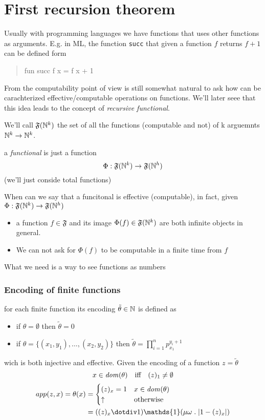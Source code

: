 \chapter{First recursion theorem}

Usually with programming languages we have functions that uses other
functions as arguments.  E.g. in ML, the function \texttt{succ} that
given a function $f$ returns $f+1$ can be defined form
\begin{quote}
    fun succ f x = f x + 1
\end{quote}
From the computability point of view is still somewhat natural to ask
how can be carachterized effective/computable operations on
functions. We'll later seee that this idea leads to the concept of
\emph{recursive functional}.

\begin{definition}
  We'll call $\mathfrak{F}(\mathbb{N}^k)$ the set of all the functions
  (computable and not) of k arguemnts $\mathbb{N}^k \rightarrow \mathbb{N}^k$.
\end{definition}

a \emph{functional} is just a function
\[
  \Phi : \mathfrak{F}(\mathbb{N}^k) \rightarrow \mathfrak{F}(\mathbb{N}^h)
\]
(we'll just conside total functions)

When can we say that a funcitonal is effective (computable), in fact,
given $\Phi : \mathfrak{F}(\mathbb{N}^k) \rightarrow \mathfrak{F}(\mathbb{N}^h)$
\begin{itemize}
\item a function $f \in \mathfrak{F}$ and its image
  $\Phi(f) \in \mathfrak{F}(\mathbb{N}^k)$ are both infinite objects in
  general.
\item We can not ask for $\Phi(f)$ to be computable in a finite time
  from $f$
\end{itemize}

What we need is a way to see functions as numbers

\subsection{Encoding of finite functions}
for each finite function its encoding $\tilde{\theta} \in \mathbb{N}$ is defined
as
\begin{itemize}
\item if $\theta = \emptyset$ then $\tilde{\theta} = 0$
\item if $\theta = \{(x_1, y_1), \dots, (x_2, y_2)\}$ then
  $\tilde{\theta} = \prod_{i=1}^n p_{x_1}^{y_i+1}$
\end{itemize}
wich is both injective and effective. Given the encoding of a function
$z= \tilde{\theta}$
\[
  x \in \mathit{dom}({\theta}) \quad \mbox{iff} \quad (z)_1 \neq \emptyset
\]
\[
  \begin{aligned}
    app(z,x) = \theta(x) & = \begin{cases}
      (z)_x = 1 & x\in\dom{\theta} \\ 
      \uparrow & \mbox{otherwise}
    \end{cases} \\
    &= ((z)_x \dotdiv 1) \mathds{1}(\mu \omega \; . \; |1 - (z)_x|)
  \end{aligned}
\]

